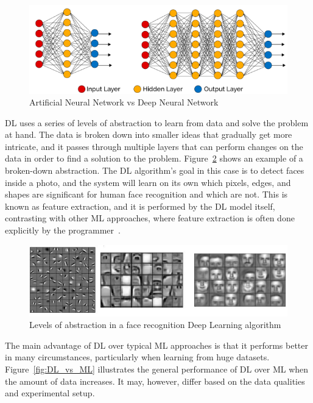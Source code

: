 \begin{figure}[htbp]
    \centering
    \includegraphics[width=0.8\linewidth]{Chapters/Figures/ann-vs-dnn.png}
    \caption{Artificial Neural Network vs Deep Neural Network~\cite{Mostafa2020MachineArticle}}
    \label{fig:ann-vs-dnn}
\end{figure}

\gls{DL} uses a series of levels of abstraction to learn from data and solve the problem at hand. The data is broken down into smaller ideas that gradually get more intricate, and it passes through multiple layers that can perform changes on the data in order to find a solution to the problem. Figure~\ref{fig:face_recog} shows an example of a broken-down abstraction. The \gls{DL} algorithm's goal in this case is to detect faces inside a photo, and the system will learn on its own which pixels, edges, and shapes are significant for human face recognition and which are not. This is known as feature extraction, and it is performed by the \gls{DL} model itself, contrasting with other \gls{ML} approaches, where feature extraction is often done explicitly by the programmer~\cite{DeClercq2018DeepSequences}.

\begin{figure}[htbp]
    \centering
    \includegraphics[width=\linewidth]{Chapters/Figures/face_recog.jpg}
    \caption{Levels of abstraction in a face recognition Deep Learning algorithm~\cite{Mohra2019DeepRecognition}}
    \label{fig:face_recog}
\end{figure}

The main advantage of \gls{DL} over typical \gls{ML} approaches is that it performs better in many circumstances, particularly when learning from huge datasets. Figure~\ref{fig:DL_vs_ML} illustrates the general performance of \gls{DL} over \gls{ML} when the amount of data increases. It may, however, differ based on the data qualities and experimental setup.


